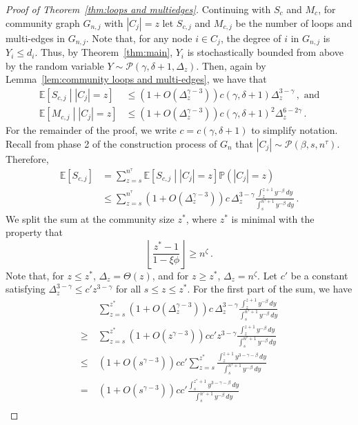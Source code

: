 \documentclass[12pt]{article}
\theoremstyle{definition}
\theoremstyle{remark}
\theoremstyle{remark}
\numberwithin{theorem}{section}
\newcommand{\E}[1]{{\mathbb E}\left[#1\right]}
\newcommand{\p}[1]{\mathbb{P}\left(#1\right)}
\newcommand{\Cexp}[2]{\mathbb{E}\left[ \left. #1 \; \right| \; #2 \right]}
\newcommand{\tpl}[3]{\ensuremath{\mathcal{P}\left(#1,#2,#3\right)}}
\begin{document}
\begin{proof}[Proof of Theorem~\ref{thm:loops and multiedges}]
Continuing with $S_c$ and $M_c$, for community graph $G_{n,j}$ with $|C_j| = z$ let $S_{c,j}$ and $M_{c,j}$ be the number of loops and multi-edges in $G_{n,j}$. Note that, for any node $i \in C_j$, the degree of $i$ in $G_{n,j}$ is $Y_i \leq d_i$. Thus, by Theorem~\ref{thm:main}, $Y_i$ is stochastically bounded from above by the random variable $Y \sim \tpl{\gamma}{\delta+1}{\Delta_z}$. Then, again by Lemma~\ref{lem:community loops and multi-edges}, we have that 
\begin{align*}
\Cexp{S_{c,j}}{|C_j|=z} &\leq \left(1 + O\left( \Delta_z^{\gamma-3} \right) \right) c(\gamma,\delta+1) \Delta_z^{3-\gamma} \,, \text{ and}\\
\Cexp{M_{c,j}}{|C_j|=z} &\leq \left(1 + O(\Delta_z^{\gamma-3}) \right) c(\gamma,\delta+1)^2 \Delta_z^{6-2\gamma} \,.
\end{align*}
For the remainder of the proof, we write $c = c(\gamma,\delta+1)$ to simplify notation. Recall from phase 2 of the construction process of $G_n$ that $|C_j| \sim \tpl{\beta}{s}{n^\tau}$. Therefore, 
\begin{align*}
\E{S_{c,j}} 
&=
\sum_{z = s}^{n^\tau} \Cexp{S_{c,j}}{|C_j| = z} \p{|C_j| = z}\\
&\leq
\sum_{z = s}^{n^\tau} \left(1 + O\left( \Delta_z^{\gamma-3} \right) \right) c \, \Delta_z^{3-\gamma} \frac{\int_z^{z+1} y^{-\beta} \, dy}{\int_s^{n^\tau + 1} y^{-\beta} \, dy} \,.
\end{align*}
We split the sum at the community size $z^*$, where $z^*$ is minimal with the property that
\[
\left\lfloor \frac{z^*-1}{1-\xi\phi} \right\rfloor \geq n^\zeta \,.
\]
Note that, for $z \leq z^*$, $\Delta_z = \Theta(z)$, and for $z \geq z^*$, $\Delta_z = n^\zeta$. Let $c'$ be a constant satisfying $\Delta_z^{3-\gamma} \leq c' z^{3-\gamma}$ for all $s \leq z \leq z^*$. For the first part of the sum, we have
\begin{align*}
&\sum_{z = s}^{z^*} \left(1 + O\left( \Delta_z^{\gamma-3} \right) \right) c \, \Delta_z^{3-\gamma} \frac{\int_z^{z+1} y^{-\beta} \, dy}{\int_s^{n^\tau + 1} y^{-\beta} \, dy}\\
\geq \ &\sum_{z = s}^{z^*} \left(1 + O\left( z^{\gamma-3} \right) \right) c c' z^{3-\gamma} \frac{\int_z^{z+1} y^{-\beta} \, dy}{\int_s^{n^\tau + 1} y^{-\beta} \, dy}\\
\leq \ & 
\left(1 + O\left( s^{\gamma-3} \right) \right) cc' \sum_{z = s}^{z^*} \frac{\int_z^{z+1} y^{3-\gamma-\beta} \, dy}{\int_s^{n^\tau + 1} y^{-\beta} \, dy}\\
= \ & 
\left(1 + O\left( s^{\gamma-3} \right) \right) cc' \frac{\int_s^{z^*+1} y^{3-\gamma-\beta} \, dy}{\int_s^{n^\tau + 1} y^{-\beta} \, dy}\\

\end{align*}
\end{proof}
\end{document}
